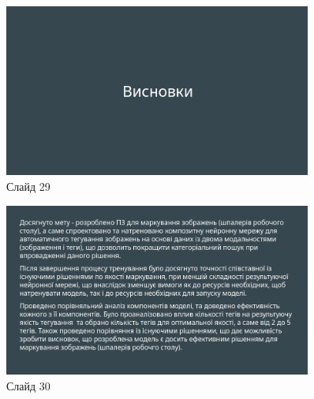\documentclass{udstu}
\begin{document}
\begin{figure}[!ht]
	\centering
	\includegraphics[width=0.9\textwidth]{PNG/present/present-29}
	\caption{Слайд 29}
\end{figure}

\begin{figure}[!ht]
	\centering
	\includegraphics[width=0.9\textwidth]{PNG/present/present-30}
	\caption{Слайд 30}
\end{figure}
\end{document}
